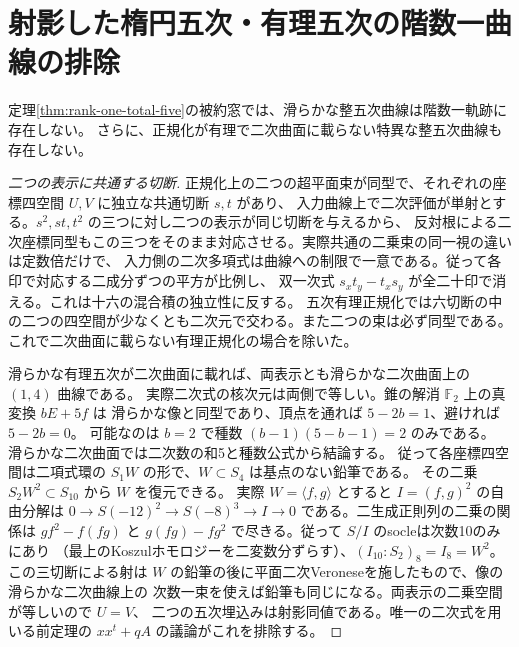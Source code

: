 \section{射影した楕円五次・有理五次の階数一曲線の排除}
\label{sec:rank-one-projected-quintics}
\begin{theorem}\label{thm:rank-one-projected-quintics}
定理\ref{thm:rank-one-total-five}の被約窓では、滑らかな整五次曲線は階数一軌跡に存在しない。
さらに、正規化が有理で二次曲面に載らない特異な整五次曲線も存在しない。
\end{theorem}
\begin{proof}[二つの表示に共通する切断]
正規化上の二つの超平面束が同型で、それぞれの座標四空間 $U,V$ に独立な共通切断 $s,t$ があり、
入力曲線上で二次評価が単射とする。$s^2,st,t^2$ の三つに対し二つの表示が同じ切断を与えるから、
反対根による二次座標同型もこの三つをそのまま対応させる。実際共通の二乗束の同一視の違いは定数倍だけで、
入力側の二次多項式は曲線への制限で一意である。従って各印で対応する二成分ずつの平方が比例し、
双一次式 $s_x t_y-t_x s_y$ が全二十印で消える。これは十六の混合積の独立性に反する。
五次有理正規化では六切断の中の二つの四空間が少なくとも二次元で交わる。また二つの束は必ず同型である。
これで二次曲面に載らない有理正規化の場合を除いた。

滑らかな有理五次が二次曲面に載れば、両表示とも滑らかな二次曲面上の $(1,4)$ 曲線である。
実際二次式の核次元は両側で等しい。錐の解消 $\mathbb F_2$ 上の真変換 $bE+5f$ は
滑らかな像と同型であり、頂点を通れば $5-2b=1$、避ければ $5-2b=0$。
可能なのは $b=2$ で種数 $(b-1)(5-b-1)=2$ のみである。
滑らかな二次曲面では二次数の和5と種数公式から結論する。
従って各座標四空間は二項式環の $S_1 W$ の形で、$W\subset S_4$ は基点のない鉛筆である。
その二乗 $S_2 W^2\subset S_{10}$ から $W$ を復元できる。
実際 $W=\langle f,g\rangle$ とすると $I=(f,g)^2$ の自由分解は
$0\to S(-12)^2\to S(-8)^3\to I\to0$ である。二生成正則列の二乗の関係は
$g f^2-f(fg)$ と $g(fg)-f g^2$ で尽きる。従って $S/I$ のsocleは次数10のみにあり
（最上のKoszulホモロジーを二変数分ずらす）、$(I_{10}:S_2)_8=I_8=W^2$。
この三切断による射は $W$ の鉛筆の後に平面二次Veroneseを施したもので、像の滑らかな二次曲線上の
次数一束を使えば鉛筆も同じになる。両表示の二乗空間が等しいので $U=V$、
二つの五次埋込みは射影同値である。唯一の二次式を用いる前定理の $xx^t+qA$ の議論がこれを排除する。
\end{proof}
